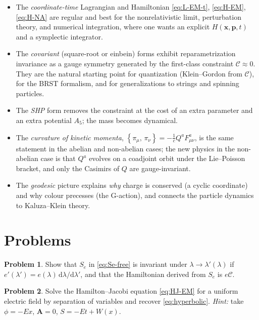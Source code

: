 \documentclass[11pt,a4paper]{book}
\numberwithin{equation}{section}
\newcommand{\dd}{\mathrm{d}}
\newcommand{\PB}[2]{\left\{#1,\,#2\right\}}
\newcommand{\Cc}{\mathcal{C}}          %
\newcommand{\bx}{\mathbf{x}}
\newcommand{\bp}{\mathbf{p}}
\newcommand{\bA}{\mathbf{A}}
\theoremstyle{definition}
\newtheorem{problem}{Problem}[chapter]
\theoremstyle{remark}
\begin{document}
\begin{itemize}[leftmargin=*]
\item The \emph{coordinate-time} Lagrangian and Hamiltonian
  \eqref{eq:L-EM-t}, \eqref{eq:H-EM}, \eqref{eq:H-NA} are regular and best
  for the nonrelativistic limit, perturbation theory, and numerical
  integration, where one wants an explicit $H(\bx,\bp,t)$ and a symplectic
  integrator.

\item The \emph{covariant} (square-root or einbein) forms exhibit
  reparametrization invariance as a gauge symmetry generated by the
  first-class constraint $\Cc\approx0$.  They are the natural starting
  point for quantization (Klein--Gordon from $\Cc$), for the BRST
  formalism, and for generalizations to strings and spinning particles.

\item The \emph{SHP} form removes the constraint at the cost of an extra
  parameter and an extra potential $A_5$; the mass becomes dynamical.

\item The \emph{curvature of kinetic momenta}, $\PB{\pi_\mu}{\pi_\nu}=-\tfrac1cQ^aF^a_{\mu\nu}$,
  is the same statement in the abelian and non-abelian cases; the new
  physics in the non-abelian case is that $Q^a$ evolves on a coadjoint
  orbit under the Lie--Poisson bracket, and only the Casimirs of $Q$ are
  gauge-invariant.

\item The \emph{geodesic} picture explains \emph{why} charge is conserved
  (a cyclic coordinate) and why colour precesses (the G-action), and
  connects the particle dynamics to Kaluza--Klein theory.
\end{itemize}

\section*{Problems}

\begin{problem}
Show that $S_e$ in \eqref{eq:Se-free} is invariant under $\lambda\to\lambda'(\lambda)$
if $e'(\lambda')=e(\lambda)\,\dd\lambda/\dd\lambda'$, and that the
Hamiltonian derived from $S_e$ is $e\Cc$.
\end{problem}

\begin{problem}
Solve the Hamilton--Jacobi equation \eqref{eq:HJ-EM} for a uniform electric
field by separation of variables and recover \eqref{eq:hyperbolic}.
\emph{Hint:} take $\phi=-Ex$, $\bA=0$, $S=-Et+W(x)$.
\end{problem}
\end{document}
